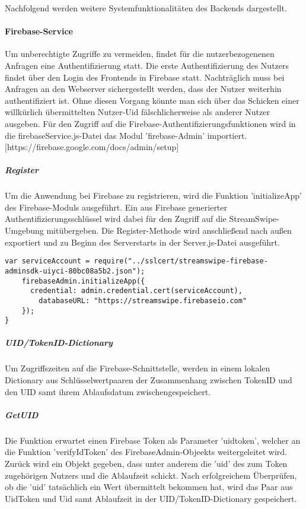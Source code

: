 Nachfolgend werden weitere Systemfunktionalitäten des Backends dargestellt.

\paragraph{Firebase-Service}
Um unberechtigte Zugriffe zu vermeiden, findet für die nutzerbezogenenen Anfragen eine Authentifizierung statt. Die erste Authentifizierung des Nutzers findet über den Login des Frontends in Firebase statt. Nachträglich muss bei Anfragen an den Webserver sichergestellt werden, dass der Nutzer weiterhin authentifiziert ist. Ohne diesen Vorgang könnte man sich über das Schicken einer willkürlich übermittelten Nutzer-Uid fälschlicherweise als anderer Nutzer ausgeben. Für den Zugriff auf die Firebase-Authentifizierungsfunktionen wird in die firebaseService.js-Datei das Modul 'firebase-Admin' importiert.
[https://firebase.google.com/docs/admin/setup]

\subparagraph{Register}
Um die Anwendung bei Firebase zu registrieren, wird die Funktion 'initializeApp' des Firebase-Moduls ausgeführt. 
Ein aus Firebase generierter Authentifizierungsschlüssel wird dabei für den Zugriff auf die StreamSwipe-Umgebung mitübergeben.
Die Register-Methode wird anschließend nach außen exportiert und zu Beginn des Serverstarts in der Server.js-Datei ausgeführt. %
   
\begin{lstlisting}[caption=Firebase-Service Register, label=lst:firebaseService Register]
  var serviceAccount = require("../sslcert/streamswipe-firebase-adminsdk-uiyci-80bc08a5b2.json");
    firebaseAdmin.initializeApp({
      credential: admin.credential.cert(serviceAccount),
        databaseURL: "https://streamswipe.firebaseio.com"
    });
}
\end{lstlisting}

\subparagraph{UID/TokenID-Dictionary}
Um Zugriffszeiten auf die Firebase-Schnittstelle, werden in einem lokalen Dictionary aus Schlüsselwertpaaren der Zusammenhang zwischen TokenID und den UID samt ihrem Ablaufsdatum zwischen\-gespeichert.

\subparagraph{GetUID}
Die Funktion erwartet einen Firebase Token als Parameter 'uidtoken', welcher an die Funktion 'verifyIdToken' des FirebaseAdmin-Objeekts weitergeleitet wird. Zurück wird ein Objekt gegeben, dass unter anderem die 'uid' des zum Token zugehörigen Nutzers und die Ablaufzeit schickt. Nach erfolgreichem Überprüfen, ob die 'uid' tatsächlich ein Wert übermittelt bekommen hat, wird das Paar aus UidToken und Uid samt Ablaufzeit in der UID/TokenID-Dictionary gespeichert.

